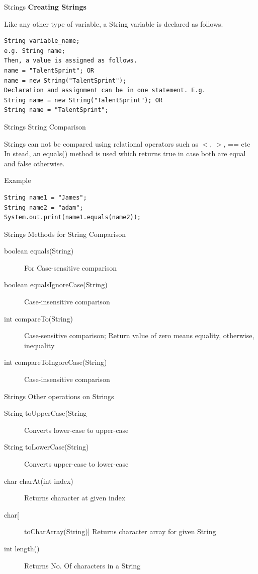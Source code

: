 \documentclass[14pt]{beamer}
\begin{document}
\begin{frame}[fragile]{Strings}
\textbf{Creating Strings}

Like any other type of variable, a String variable is declared as follows.
\begin{lstlisting}[numbers=none]
String variable_name;
e.g. String name;
Then, a value is assigned as follows.
name = "TalentSprint"; OR
name = new String("TalentSprint"); 
Declaration and assignment can be in one statement. E.g.  
String name = new String("TalentSprint"); OR
String name = "TalentSprint";
\end{lstlisting}
\end{frame}

\begin{frame}[fragile]{Strings}
String Comparison

Strings can not be compared using relational operators such as $<$, $>$, == etc
In stead, an equals() method is used which returns true in case both are equal and false otherwise.
\begin{block}{Example}
\begin{lstlisting}[numbers=none]
String name1 = "James";
String name2 = "adam";
System.out.print(name1.equals(name2));
\end{lstlisting}
\end{block}
\end{frame}

\begin{frame}{Strings}
Methods for String Comparison
\begin{description}
\item [boolean equals(String)] For Case-sensitive comparison
\item [boolean  equalsIgnoreCase(String)] Case-insensitive comparison
\item [int  compareTo(String)] Case-sensitive comparison; Return value of zero means equality, otherwise, inequality
\item [int compareToIngoreCase(String)] Case-insensitive comparison
\end{description}
\end{frame}

\begin{frame}{Strings}
Other operations on Strings
\begin{description}
\item [String toUpperCase(String] Converts lower-case to upper-case
\item [String toLowerCase(String)] Converts upper-case to lower-case
\item [char charAt(int index)] Returns character at given index
\item [char[] toCharArray(String)] Returns character array for given String
\item [int length()] Returns No. Of characters in a String
\end{description}
\end{frame}
\end{document}
